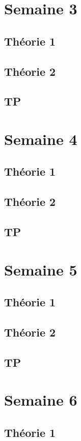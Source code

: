 \documentclass{article}
\begin{document}
\pagebreak
\section{Semaine 3}
\subsection{Théorie 1}
\subsection{Théorie 2}
\subsection{TP}

\pagebreak
\section{Semaine 4}
\subsection{Théorie 1}
\subsection{Théorie 2}
\subsection{TP}

\pagebreak
\section{Semaine 5}
\subsection{Théorie 1}
\subsection{Théorie 2}
\subsection{TP}

\pagebreak
\section{Semaine 6}
\subsection{Théorie 1}
\end{document}
